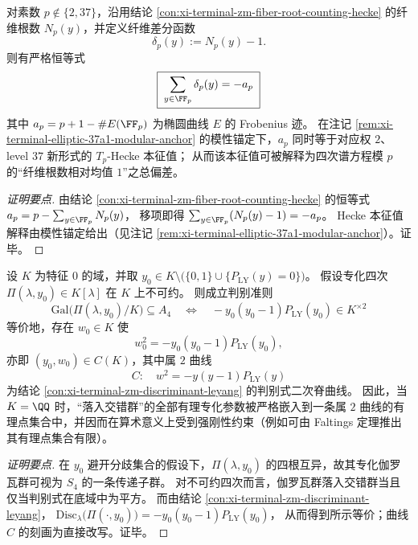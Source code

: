 \begin{conclusion}\label{con:xi-terminal-zm-hecke-eigenvalue-fiber-deviation}
对素数 \(p\notin\{2,37\}\)，沿用结论 \ref{con:xi-terminal-zm-fiber-root-counting-hecke} 的纤维根数 \(N_p(y)\)，并定义纤维差分函数
\[
\delta_p(y):=N_p(y)-1.
\]
则有严格恒等式
\[
\boxed{\;\sum_{y\in\FF_p}\delta_p(y)=-a_p\;}
\]
其中 \(a_p=p+1-\#E(\FF_p)\) 为椭圆曲线 \(E\) 的 Frobenius 迹。
在注记 \ref{rem:xi-terminal-elliptic-37a1-modular-anchor} 的模性锚定下，\(a_p\) 同时等于对应权 \(2\)、level \(37\) 新形式的 \(T_p\)-Hecke 本征值；
从而该本征值可被解释为四次谱方程模 \(p\) 的“纤维根数相对均值 \(1\)”之总偏差。
\end{conclusion}
\begin{proof}[证明要点]
由结论 \ref{con:xi-terminal-zm-fiber-root-counting-hecke} 的恒等式
\(
a_p=p-\sum_{y\in\FF_p}N_p(y)
\)，
移项即得
\(
\sum_{y\in\FF_p}(N_p(y)-1)=-a_p
\)。
Hecke 本征值解释由模性锚定给出（见注记 \ref{rem:xi-terminal-elliptic-37a1-modular-anchor}）。证毕。
\end{proof}

\begin{conclusion}\label{con:xi-terminal-zm-specialization-a4-square-criterion}
设 \(K\) 为特征 \(0\) 的域，并取 \(y_{0}\in K\setminus\bigl(\{0,1\}\cup\{P_{\mathrm{LY}}(y)=0\}\bigr)\)。
假设专化四次 \(\Pi(\lambda,y_{0})\in K[\lambda]\) 在 \(K\) 上不可约。
则成立判别准则
\[
\boxed{\;
\mathrm{Gal}\bigl(\Pi(\lambda,y_{0})/K\bigr)\subseteq A_{4}
\quad\Longleftrightarrow\quad
-y_{0}(y_{0}-1)P_{\mathrm{LY}}(y_{0})\in K^{\times 2}\;}
\]
等价地，存在 \(w_{0}\in K\) 使
\[
w_{0}^{2}=-y_{0}(y_{0}-1)P_{\mathrm{LY}}(y_{0}),
\]
亦即 \((y_{0},w_{0})\in C(K)\)，其中属 \(2\) 曲线
\[
C:\quad w^{2}=-y(y-1)P_{\mathrm{LY}}(y)
\]
为结论 \ref{con:xi-terminal-zm-discriminant-leyang} 的判别式二次脊曲线。
因此，当 \(K=\QQ\) 时，“落入交错群”的全部有理专化参数被严格嵌入到一条属 \(2\) 曲线的有理点集合中，并因而在算术意义上受到强刚性约束（例如可由 Faltings 定理推出其有理点集合有限）。
\end{conclusion}
\begin{proof}[证明要点]
在 \(y_{0}\) 避开分歧集合的假设下，\(\Pi(\lambda,y_{0})\) 的四根互异，故其专化伽罗瓦群可视为 \(S_{4}\) 的一条传递子群。
对不可约四次而言，伽罗瓦群落入交错群当且仅当判别式在底域中为平方。
而由结论 \ref{con:xi-terminal-zm-discriminant-leyang}，
\(
\mathrm{Disc}_{\lambda}\bigl(\Pi(\cdot,y_{0})\bigr)=-y_{0}(y_{0}-1)P_{\mathrm{LY}}(y_{0})
\)，
从而得到所示等价；曲线 \(C\) 的刻画为直接改写。证毕。
\end{proof}

